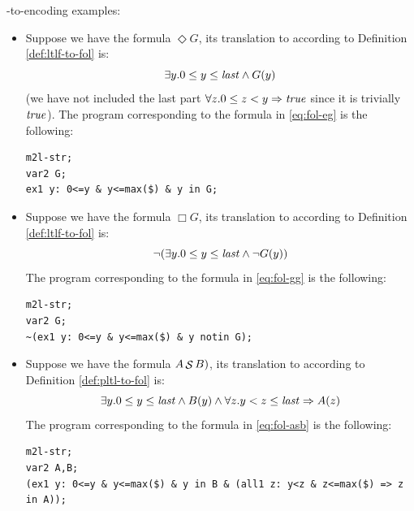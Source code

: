 \begin{example}
\FOL-to-\MONA encoding examples:\\
\begin{itemize}
\item Suppose we have the \LTLf formula $\Diamond G$, its translation to \FOL according to Definition \ref{def:ltlf-to-fol} is:
\begin{equation}\label{eq:fol-eg}
\exists y. 0 \le y \le \mathit{last} \wedge G(y)
\end{equation}
(we have not included the last part $\forall z. 0 \le z < y \Rightarrow \mathit{true}$ since it is trivially $\mathit{true}$).
The \MONA program corresponding to the formula in \ref{eq:fol-eg} is the following:
\begin{lstlisting}[style=mona]
m2l-str;
var2 G;
ex1 y: 0<=y & y<=max($) & y in G;
\end{lstlisting}

\item Suppose we have the \LTLf formula $\Box G$, its translation to \FOL according to Definition \ref{def:ltlf-to-fol} is:
\begin{equation}\label{eq:fol-gg}
\lnot (\exists y. 0 \le y \le \mathit{last} \wedge \lnot G(y))
\end{equation}
The \MONA program corresponding to the formula in \ref{eq:fol-gg} is the following:
\begin{lstlisting}[style=mona]
m2l-str;
var2 G;
~(ex1 y: 0<=y & y<=max($) & y notin G);
\end{lstlisting}

\item Suppose we have the \PLTL formula $A \mathop{\mathcal{S}} B)$, its translation to \FOL according to Definition \ref{def:pltl-to-fol} is:
\begin{equation}\label{eq:fol-asb}
\exists y. 0 \le y \le \mathit{last} \wedge B(y) \wedge \forall z. y < z \le \mathit{last} \Rightarrow A(z)
\end{equation}
The \MONA program corresponding to the formula in \ref{eq:fol-asb} is the following:
\begin{lstlisting}[style=mona]
m2l-str;
var2 A,B;
(ex1 y: 0<=y & y<=max($) & y in B & (all1 z: y<z & z<=max($) => z in A));
\end{lstlisting}
\end{itemize}
\end{example}


